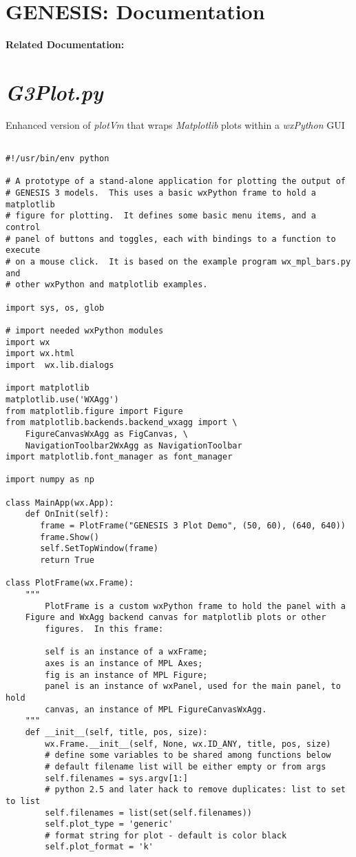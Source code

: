 \documentclass[12pt]{article}
\begin{document}
\section*{GENESIS: Documentation}

{\bf Related Documentation:}

\section*{\it G3Plot.py}

Enhanced version of {\it plotVm} that wraps {\it Matplotlib}
plots within a {\it wxPython} GUI

\begin{verbatim}

#!/usr/bin/env python

# A prototype of a stand-alone application for plotting the output of
# GENESIS 3 models.  This uses a basic wxPython frame to hold a matplotlib
# figure for plotting.  It defines some basic menu items, and a control
# panel of buttons and toggles, each with bindings to a function to execute
# on a mouse click.  It is based on the example program wx_mpl_bars.py and
# other wxPython and matplotlib examples.

import sys, os, glob

# import needed wxPython modules
import wx
import wx.html
import  wx.lib.dialogs

import matplotlib
matplotlib.use('WXAgg')
from matplotlib.figure import Figure
from matplotlib.backends.backend_wxagg import \
    FigureCanvasWxAgg as FigCanvas, \
    NavigationToolbar2WxAgg as NavigationToolbar
import matplotlib.font_manager as font_manager

import numpy as np

class MainApp(wx.App):
    def OnInit(self):
       frame = PlotFrame("GENESIS 3 Plot Demo", (50, 60), (640, 640))
       frame.Show()
       self.SetTopWindow(frame)
       return True
    
class PlotFrame(wx.Frame):
    """
        PlotFrame is a custom wxPython frame to hold the panel with a
	Figure and WxAgg backend canvas for matplotlib plots or other
        figures.  In this frame:

        self is an instance of a wxFrame;
        axes is an instance of MPL Axes;
        fig is an instance of MPL Figure;
        panel is an instance of wxPanel, used for the main panel, to hold
        canvas, an instance of MPL FigureCanvasWxAgg.
    """    
    def __init__(self, title, pos, size):
        wx.Frame.__init__(self, None, wx.ID_ANY, title, pos, size)
        # define some variables to be shared among functions below
        # default filename list will be either empty or from args
        self.filenames = sys.argv[1:]
        # python 2.5 and later hack to remove duplicates: list to set to list
        self.filenames = list(set(self.filenames))
        self.plot_type = 'generic'
        # format string for plot - default is color black
        self.plot_format = 'k'


\end{verbatim}
\end{document}
